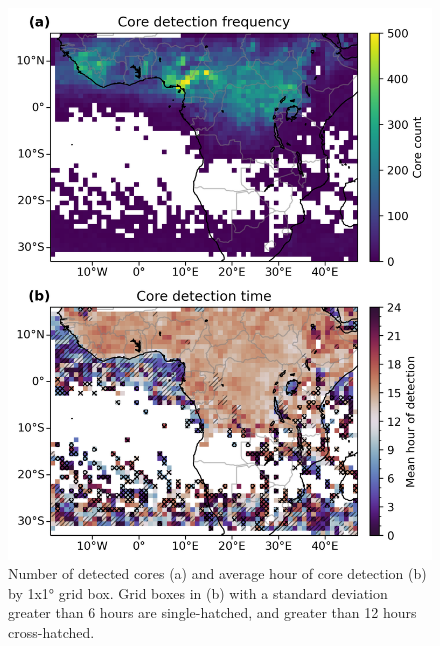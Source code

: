 \begin{figure}[t]
    \includegraphics[width=\textwidth]{figures/ch3_05.png}
    \caption[
    Number of detected cores and average hour of core detection
    ]{
    Number of detected cores (a) and average hour of core detection (b) by 1x1° grid box. Grid boxes in (b) with a standard deviation greater than 6 hours are single-hatched, and greater than 12 hours cross-hatched.
    }
    \label{fig:seviri_map_dists}
\end{figure}


